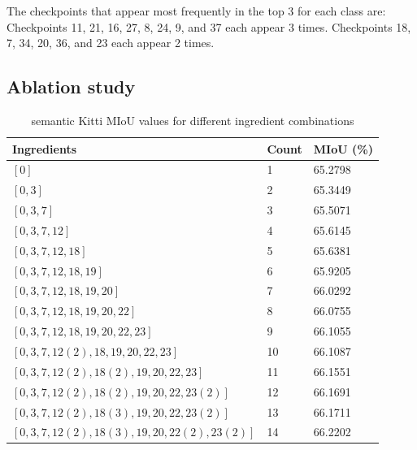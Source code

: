 \documentclass[10pt,twocolumn,letterpaper]{article}
\begin{document}
The checkpoints that appear most frequently in the top 3 for each class are:
Checkpoints 11, 21, 16, 27, 8, 24, 9, and 37 each appear 3 times.
Checkpoints 18, 7, 34, 20, 36, and 23 each appear 2 times.

\subsection{Ablation study}

\begin{table}[!h]
\centering
\small
\begin{tabular}{|l|l|l|}
\hline
\textbf{Ingredients} & \textbf{Count} & \textbf{MIoU (\%)} \\
\hline
$[0]$ & 1 & 65.2798 \\
$[0,3]$ & 2 & 65.3449 \\
$[0,3,7]$ & 3 & 65.5071 \\
$[0,3,7,12]$ & 4 & 65.6145 \\
$[0,3,7,12,18]$ & 5 & 65.6381 \\
$[0,3,7,12,18,19]$ & 6 & 65.9205 \\
$[0,3,7,12,18,19,20]$ & 7 & 66.0292 \\
$[0,3,7,12,18,19,20,22]$ & 8 & 66.0755 \\
$[0,3,7,12,18,19,20,22,23]$ & 9 & 66.1055 \\
$[0,3,7,12(2),18,19,20,22,23]$ & 10 & 66.1087 \\
$[0,3,7,12(2),18(2),19,20,22,23]$ & 11 & 66.1551 \\
$[0,3,7,12(2),18(2),19,20,22,23(2)]$ & 12 & 66.1691 \\
$[0,3,7,12(2),18(3),19,20,22,23(2)]$ & 13 & 66.1711 \\
$[0,3,7,12(2),18(3),19,20,22(2),23(2)]$ & 14 & 66.2202 \\
\hline
\end{tabular}
\caption{semantic Kitti MIoU values for different ingredient combinations}
\end{table}
\end{document}
